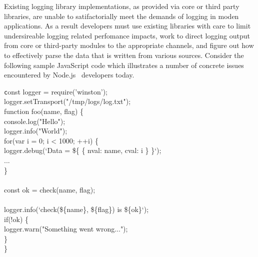 \documentclass[twocolumn,10pt]{article}
\begin{document}

Existing logging library implementations, as provided via core or third party
libraries, are unable to satifactorially meet the demands of logging in moden
applications. As a result developers must use existing libraries with care to
limit undersireable logging related perfomance impacts, work to direct logging
output from core or third-party modules to the appropriate channels, and figure
out how to effectively parse the data that is written from various sources.
Consider the following sample JavaScript code which illustrates a number of
concrete issues encountered by Node.js~\cite{Node} developers today.

\noindent
{\texttt
const logger = require('winston'); \\
logger.setTransport("/tmp/logs/log.txt"); \\
function foo(name, flag) \{ \\
    console.log("Hello"); \\
    logger.info("World"); \\
    for(var i = 0; i < 1000; ++i) \{ \\
        logger.debug(`Data = \$\{  \{ nval: name, cval: i \}  \}`); \\
        ...\\
    \} \\
    \\
    const ok = check(name, flag);\\
    \\
    logger.info(`check(\$\{name\}, \$\{flag\}) is \$\{ok\}`);\\
    if(!ok) \{\\
        logger.warn("Something went wrong...");\\
    \}\\
\}
}
\end{document}
